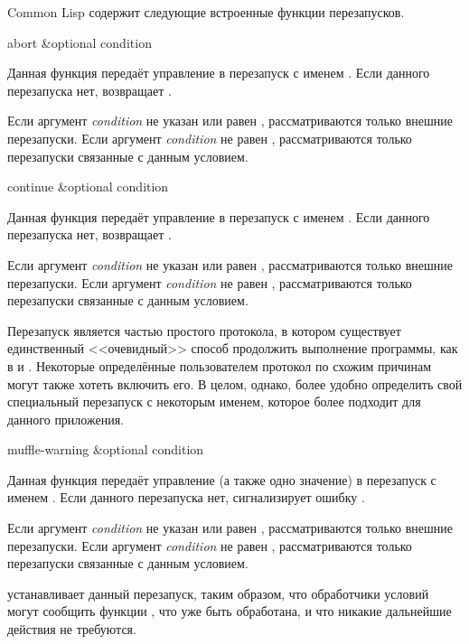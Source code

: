 Common Lisp содержит следующие встроенные функции перезапусков.

\begin{defun}[Функция]
abort &optional condition

Данная функция передаёт управление в перезапуск с именем . Если
данного перезапуска нет,  возвращает .

Если аргумент \emph{condition} не указан или равен , рассматриваются
только внешние перезапуски. Если аргумент \emph{condition} не равен ,
рассматриваются только перезапуски связанные с данным условием.
\end{defun}

\begin{defun}[Функция]
continue &optional condition

Данная функция передаёт управление в перезапуск с именем . Если
данного перезапуска нет,  возвращает .

Если аргумент \emph{condition} не указан или равен , рассматриваются
только внешние перезапуски. Если аргумент \emph{condition} не равен ,
рассматриваются только перезапуски связанные с данным условием.

Перезапуск  является частью простого протокола, в котором
существует единственный <<очевидный>> способ продолжить выполнение программы,
как в  и . Некоторые определённые пользователем протокол
по схожим причинам могут также хотеть включить его. В целом, однако, более
удобно определить свой специальный перезапуск с некоторым именем, которое более
подходит для данного приложения.
\end{defun}

\begin{defun}[Функция]
muffle-warning &optional condition

Данная функция передаёт управление (а также одно значение) в перезапуск с
именем . Если данного перезапуска нет, 
сигнализирует ошибку .

Если аргумент \emph{condition} не указан или равен , рассматриваются
только внешние перезапуски. Если аргумент \emph{condition} не равен ,
рассматриваются только перезапуски связанные с данным условием.

 устанавливает данный перезапуск, таким образом, что обработчики
условий  могут сообщить функции , что  уже
быть обработана, и что никакие дальнейшие действия не требуются.
\end{defun}

